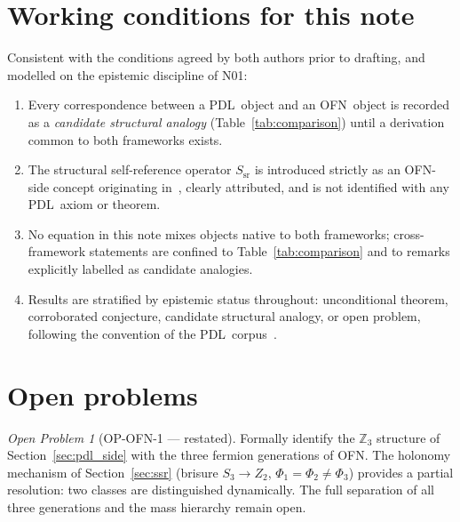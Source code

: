 \documentclass[11pt,a4paper]{article}
\theoremstyle{plain}
\theoremstyle{definition}
\theoremstyle{remark}
\newtheorem{openproblem}[theorem]{Open Problem}
\newcommand{\PDL}{\textnormal{PDL}}
\newcommand{\OFN}{\textnormal{OFN}}
\newcommand{\Zthree}{\mathbb{Z}_3}
\newcommand{\Ssr}{S_{\mathrm{sr}}}
\begin{document}
\section{Working conditions for this note}
\label{sec:conditions}

Consistent with the conditions agreed by both authors prior to drafting, and modelled on the epistemic discipline of N01:

\begin{enumerate}[leftmargin=2em]
\item Every correspondence between a \PDL\ object and an \OFN\ object is recorded as a \emph{candidate structural analogy} (Table~\ref{tab:comparison}) until a derivation common to both frameworks exists.
\item The structural self-reference operator $\Ssr$ is introduced strictly as an \OFN-side concept originating in~\cite{DTOCOFN}, clearly attributed, and is not identified with any \PDL\ axiom or theorem.
\item No equation in this note mixes objects native to both frameworks; cross-framework statements are confined to Table~\ref{tab:comparison} and to remarks explicitly labelled as candidate analogies.
\item Results are stratified by epistemic status throughout: \textcolor{proofblue}{unconditional theorem}, \textcolor{conjecturegreen}{corroborated conjecture}, \textcolor{hypothesisorange}{candidate structural analogy}, or open problem, following the convention of the \PDL\ corpus~\cite{DMv29}.
\end{enumerate}

\section{Open problems}
\label{sec:open}

\begin{openproblem}[OP-OFN-1 --- restated]
Formally identify the $\Zthree$ structure of Section~\ref{sec:pdl_side} with the three fermion generations of \OFN. The holonomy mechanism of Section~\ref{sec:ssr} (brisure $S_3\to Z_2$, $\Phi_1=\Phi_2\neq\Phi_3$) provides a partial resolution: two classes are distinguished dynamically. The full separation of all three generations and the mass hierarchy remain open.
\end{openproblem}
\end{document}
